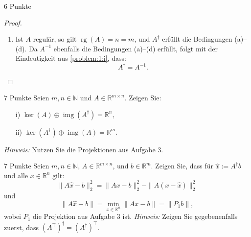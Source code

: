 \documentclass{problemset}
\begin{document}
\begin{problem}{6 Punkte}
\begin{proof}
\begin{enumerate}
        \item Ist \( A \) regulär, so gilt \( \operatorname{rg}(A) = n = m \),
              und \( A^\dagger \) erfüllt die Bedingungen (a)–(d). Da \( A^{-1}
              \) ebenfalls die Bedingungen (a)–(d) erfüllt, folgt mit der
              Eindeutigkeit aus \ref{problem:1:i}, dass:
              \[
                  A^\dagger = A^{-1}.
              \]
    \end{enumerate}
\end{proof}
\end{problem}

\setcounter{problem}{3}

\begin{problem}{7 Punkte}
Seien \( m, n \in \mathbb{N} \) und \( A \in \mathbb{R}^{m \times n} \). Zeigen Sie:
\begin{enumerate}
    \item[i)] \( \ker(A) \oplus \operatorname{img}(A^\dagger) = \mathbb{R}^n
          \),
    \item[ii)] \( \ker(A^\dagger) \oplus \operatorname{img}(A) = \mathbb{R}^m
          \).
\end{enumerate}
\textit{Hinweis:} Nutzen Sie die Projektionen aus Aufgabe 3.
\end{problem}

\begin{problem}{7 Punkte}
Seien \( m, n \in \mathbb{N} \), \( A \in \mathbb{R}^{m \times n} \), und \( b
\in \mathbb{R}^m \). Zeigen Sie, dass für \( \hat{x} := A^\dagger b \) und alle
\( x \in \mathbb{R}^n \) gilt:
\[
    \|A \hat{x} - b\|_2^2 = \|A x - b\|_2^2 - \|A (x - \hat{x})\|_2^2
\]
und
\[
    \|A \hat{x} - b\| = \min_{x \in \mathbb{R}^n} \|A x - b\| = \|P_1 b\|,
\]
wobei \( P_1 \) die Projektion aus Aufgabe 3 ist. \textit{Hinweis:} Zeigen
  Sie gegebenenfalls zuerst, dass \( (A^\top)^\dagger = (A^\dagger)^\top \).
\end{problem}
\end{document}
